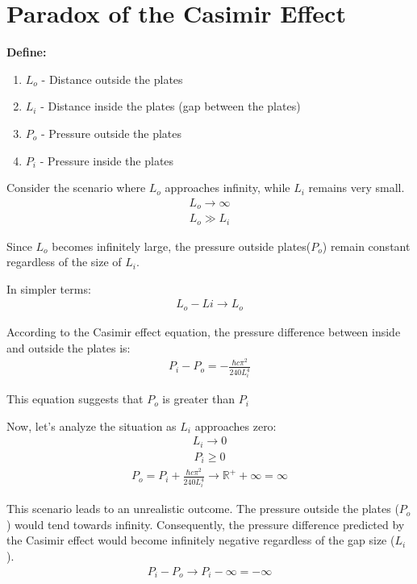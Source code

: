 \section{Paradox of the Casimir Effect}
\noindent\textbf{Define:}
\begin{enumerate}
    \item \(L_o\) - Distance outside the plates
    \item \(L_i\) - Distance inside the plates (gap between the plates)
    \item \(P_o\) - Pressure outside the plates
    \item \(P_i\) - Pressure inside the plates
\end{enumerate}

Consider the scenario where  $L_o$ approaches infinity, while $L_i$ remains very small.
\begin{align}L_o \rightarrow \infty\end{align}
\begin{align}L_o \gg L_i\end{align}

Since $L_o$ becomes infinitely large, the pressure outside plates($P_o$) remain constant regardless of the size of $L_i$.

\noindent In simpler terms:
\begin{align}L_o - Li \rightarrow L_o\end{align}

According to the Casimir effect equation, the pressure difference between inside and outside the plates is:
\begin{align}P_i - P_o = -\frac{\hbar c \pi^2}{240 L_i^4}\end{align}

This equation suggests that $P_o$ is greater than $P_i$

Now, let's analyze the situation as $L_i$ approaches zero:
\begin{align}L_i \rightarrow 0\end{align}
\begin{align}P_i \ge 0\end{align}
\begin{align}P_o = P_i + \frac{\hbar c \pi^2}{240 L_i^4} \rightarrow {\mathbb{R}}^+ + \infty = \infty \end{align}

This scenario leads to an unrealistic outcome. The pressure outside the plates ($P_o$) would tend towards infinity.
Consequently, the pressure difference predicted by the Casimir effect would become infinitely negative regardless of the gap size ($L_i$).
\begin{align}P_i - P_o \rightarrow P_i - \infty = - \infty\end{align}

